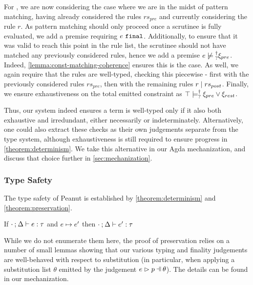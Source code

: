 For \TMatchNZPre, we are now considering the case where we are in the midst of pattern matching, having already considered the rules $rs_{pre}$ and currently considering the rule $r$. As pattern matching should only proceed once a scrutinee is fully evaluated, we add a premise requiring $e ~\mathtt{final}$. Additionally, to ensure that it was valid to reach this point in the rule list, the scrutinee should not have matched any previously considered rules, hence we add a premise $\cnotsatisfyormay{e}{\xi_{pre}}$. Indeed, \autoref{lemma:const-matching-coherence} ensures this is the case. As well, we again require that the rules are well-typed, checking this piecewise - first with the previously considered rules $rs_{pre}$, then with the remaining rules $r \mid rs_{post}$. Finally, we ensure exhaustiveness on the total emitted constraint as $\top \models_{?}^{\dag} \xi_{pre} \vee \xi_{rest}$.

Thus, our system indeed ensures a term is well-typed only if it also both exhaustive and irredundant, either necessarily or indeterminately. Alternatively, one could also extract these checks as their own judgements separate from the type system, although exhaustiveness is still required to ensure progress in \autoref{theorem:determinism}. We take this alternative in our Agda mechanization, and discuss that choice further in \autoref{sec:mechanization}.

\subsubsection{Type Safety}
The type safety of Peanut is established by \autoref{theorem:determinism} and \autoref{theorem:preservation}.

\begin{theorem}[Preservation]
	\label{theorem:preservation}
	If $\cdot \mathbin{;} \Delta \vdash e : \tau$ and $e \mapsto e'$
	then $\cdot \mathbin{;} \Delta \vdash e' : \tau$
\end{theorem}
While we do not enumerate them here, the proof of preservation relies on a number of small lemmas showing that our various typing and finality judgements are well-behaved with respect to substitution (in particular, when applying a substitution list $\theta$ emitted by the judgement $\hpatmatch{e}{p}{\theta}$). The details can be found in our mechanization.

